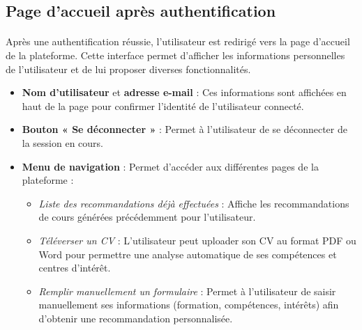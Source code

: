 \noindent
\newpage
\subsection*{Page d'accueil après authentification}
\paragraph{}
Après une authentification réussie, l'utilisateur est redirigé vers la page d'accueil de la plateforme. Cette interface permet d'afficher les informations personnelles de l'utilisateur et de lui proposer diverses fonctionnalités.
\begin{itemize}
  \item \textbf{Nom d'utilisateur} et \textbf{adresse e-mail} : Ces informations sont affichées en haut de la page pour confirmer l'identité de l'utilisateur connecté.
  \item \textbf{Bouton « Se déconnecter »} : Permet à l'utilisateur de se déconnecter de la session en cours.
  \item \textbf{Menu de navigation} : Permet d’accéder aux différentes pages de la plateforme :
  \begin{itemize}
    \item \textit{Liste des recommandations déjà effectuées} : Affiche les recommandations de cours générées précédemment pour l'utilisateur.
    \item \textit{Téléverser un CV} : L'utilisateur peut uploader son CV au format PDF ou Word pour permettre une analyse automatique de ses compétences et centres d’intérêt.
    \item \textit{Remplir manuellement un formulaire} : Permet à l’utilisateur de saisir manuellement ses informations (formation, compétences, intérêts) afin d’obtenir une recommandation personnalisée.
  \end{itemize}
\end{itemize}
 
